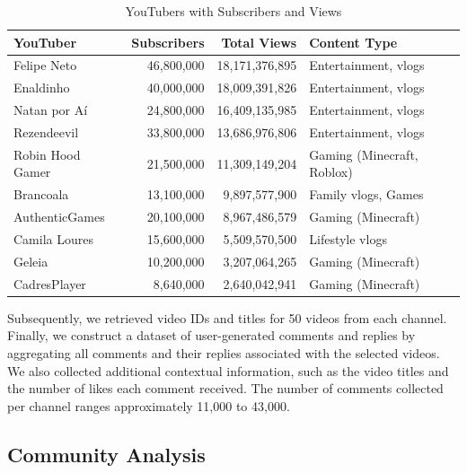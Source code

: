 \documentclass[12pt]{article}
\begin{document}
\begin{table}[h!]
\centering
\caption{YouTubers with Subscribers and Views}
\label{tab:youtubers}
\begin{tabular}{|l|r|r|l|}
\hline
\textbf{YouTuber}        & \textbf{Subscribers}    & \textbf{Total Views}       & \textbf{Content Type }      \\ \hline
Felipe Neto              & 46,800,000             & 18,171,376,895        & Entertainment, vlogs        \\ \hline
Enaldinho                & 40,000,000             & 18,009,391,826        & Entertainment, vlogs        \\ \hline
Natan por Aí             & 24,800,000             & 16,409,135,985        & Entertainment, vlogs        \\ \hline
Rezendeevil              & 33,800,000             & 13,686,976,806        & Entertainment, vlogs        \\ \hline
Robin Hood Gamer         & 21,500,000             & 11,309,149,204        & Gaming (Minecraft, Roblox)  \\ \hline
Brancoala                & 13,100,000             & 9,897,577,900         & Family vlogs, Games         \\ \hline
AuthenticGames           & 20,100,000             & 8,967,486,579         & Gaming (Minecraft)          \\ \hline
Camila Loures            & 15,600,000             & 5,509,570,500         & Lifestyle vlogs             \\ \hline
Geleia                   & 10,200,000             & 3,207,064,265         & Gaming (Minecraft)          \\ \hline
CadresPlayer             & 8,640,000              & 2,640,042,941         & Gaming (Minecraft)          \\ \hline
\end{tabular}
\end{table}

Subsequently, we retrieved video IDs and titles for 50 videos from each channel. 
Finally, we construct a dataset of user-generated comments and replies by aggregating all comments 
and their replies associated with the selected videos. We also collected additional contextual information, such as 
the video titles and the number of likes each comment received. 
The number of comments collected per channel ranges approximately 11,000 to 43,000.


\subsection{Community Analysis}
\end{document}
